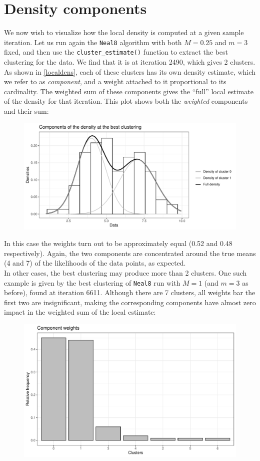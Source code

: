 \section{Density components}
We now wish to visualize how the local density is computed at a given sample iteration.
Let us run again the \verb|Neal8| algorithm with both $M=0.25$ and $m=3$ fixed, and then use the \verb|cluster_estimate()| function to extract the best clustering for the data.
We find that it is at iteration 2490, which gives 2 clusters.
As shown in \ref{localdens}, each of these clusters has its own density estimate, which we refer to as \emph{component}, and a weight attached to it proportional to its cardinality.
The weighted sum of these components gives the ``full'' local estimate of the density for that iteration.
This plot shows both the \emph{weighted} components and their sum:
\begin{figure}[h]
	\centering
	\includegraphics[scale=0.6]{etc/componentsM025m3_best.pdf}
\end{figure}

In this case the weights turn out to be approximately equal (0.52 and 0.48 respectively).
Again, the two components are concentrated around the true means (4 and 7) of the likelihoods of the data points, as expected. \\
In other cases, the best clustering may produce more than 2 clusters.
One such example is given by the best clustering of \verb|Neal8| run with $M=1$ (and $m=3$ as before), found at iteration 6611.
Although there are 7 clusters, all weights bar the first two are insignificant, making the corresponding components have almost zero impact in the weighted sum of the local estimate:
\begin{figure}[h]
	\centering
	\includegraphics[scale=0.44]{etc/barplotM1m3.pdf}
\end{figure}

